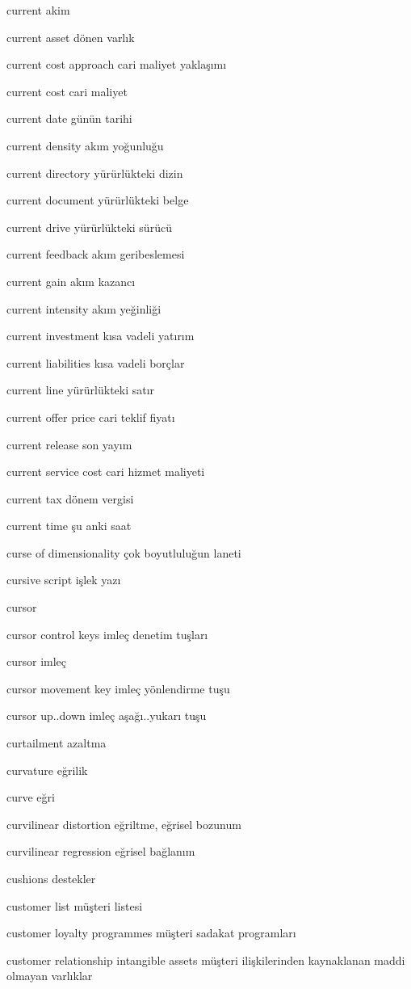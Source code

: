 \documentclass[12pt,fleqn]{article}\usepackage{../../common}
\begin{document}
current akim

current asset dönen varlık

current cost approach cari maliyet yaklaşımı

current cost cari maliyet

current date günün tarihi

current density akım yoğunluğu

current directory yürürlükteki dizin

current document yürürlükteki belge

current drive yürürlükteki sürücü

current feedback akım geribeslemesi

current gain akım kazancı

current intensity akım yeğinliği

current investment kısa vadeli yatırım

current liabilities kısa vadeli borçlar

current line yürürlükteki satır

current offer price cari teklif fiyatı

current release son yayım

current service cost cari hizmet maliyeti

current tax dönem vergisi

current time şu anki saat

curse of dimensionality çok boyutluluğun laneti

cursive script işlek yazı

cursor

cursor control keys imleç denetim tuşları

cursor imleç

cursor movement key imleç yönlendirme tuşu

cursor up..down imleç aşağı..yukarı tuşu

curtailment azaltma

curvature eğrilik

curve eğri

curvilinear distortion eğriltme, eğrisel bozunum

curvilinear regression eğrisel bağlanım

cushions destekler

customer list müşteri listesi

customer loyalty programmes müşteri sadakat programları

customer relationship intangible assets müşteri ilişkilerinden kaynaklanan maddi olmayan varlıklar
\end{document}
